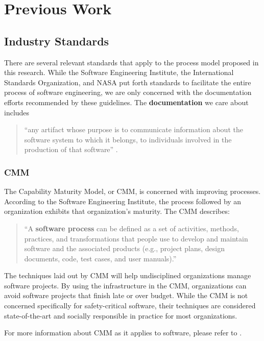 \section{Previous Work}\label{previous}

\subsection{Industry Standards}
There are several relevant standards that apply to the process model proposed in
this research. While the Software Engineering Institute, the International
Standards Organization, and NASA put forth standards to facilitate the entire
process of software engineering, we are only concerned with the documentation
efforts recommended by these guidelines. The \textbf{documentation} we care
about includes 
\begin{quote}
``any artifact whose purpose is to communicate information about the software
system to which it belongs, to individuals involved in the production of that
software'' \cite{Forward2002}.
\end{quote}

\subsubsection{CMM}
The Capability Maturity Model, or CMM, is concerned with improving processes.
According to the Software Engineering Institute, the process followed by an
organization exhibits that organization's maturity. The CMM describes:

\begin{quote}\label{process}
``A \textbf{software process} can be defined as a set of activities, methods,
practices, and transformations that people use to develop and maintain software
and the associated products (e.g., project plans, design documents, code, test
cases, and user manuals).'' \cite{CMM11}
\end{quote}

The techniques laid out by CMM will help undisciplined organizations manage
software projects. By using the infrastructure in the CMM, organizations can 
avoid software projects that finish late or over budget. While the CMM is not
concerned specifically for safety-critical software, their techniques are
considered state-of-the-art and socially responsible in practice for most
organizations.

For more information about CMM as it applies to software, please refer to
\cite{CMM11}.

